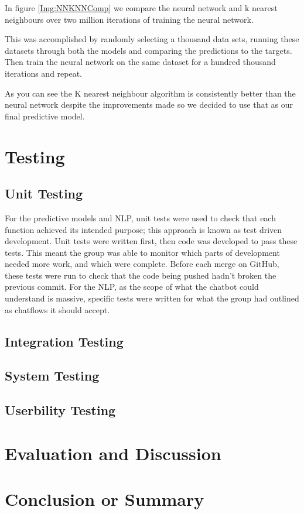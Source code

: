 \documentclass[11pt]{article}
\begin{document}
	In figure \ref{Img:NNKNNComp} we compare the neural network and k nearest neighbours over two million iterations of training the neural network.
	
	This was accomplished by randomly selecting a thousand data sets, running these datasets through both the models and comparing the predictions to the targets. Then train the neural network on the same dataset for a hundred thousand iterations and repeat.
	
	As you can see the K nearest neighbour algorithm is consistently better than the neural network despite the improvements made so we decided to use that as our final predictive model.
	
	\section{Testing} \label{Testing}
	
	\subsection{Unit Testing}
	For the predictive models and NLP, unit tests were used to check that each function achieved its intended purpose; this approach is known as test driven development. Unit tests were written first, then code was developed to pass these tests. This meant the group was able to monitor which parts of development needed more work, and which were complete. Before each merge on GitHub, these tests were run to check that the code being pushed hadn’t broken the previous commit. For the NLP, as the scope of what the chatbot could understand is massive, specific tests were written for what the group had outlined as chatflows it should accept. 
	
	
	\subsection{Integration Testing}
	
	\subsection{System Testing}
	
	\subsection{Userbility Testing}
	
	\section{Evaluation and Discussion}\label {Evaluation}
	
	\section{Conclusion or Summary} \label{Conclusion}
	
	
	 
	
\end{document}
